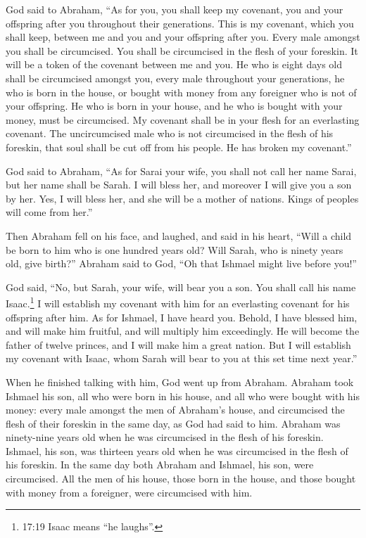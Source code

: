  God said to Abraham, ``As for you, you shall keep my
covenant, you and your offspring after you throughout their generations.
 This is my covenant, which you shall keep, between me and
you and your offspring after you. Every male amongst you shall be
circumcised.  You shall be circumcised in the flesh of your
foreskin. It will be a token of the covenant between me and you.
 He who is eight days old shall be circumcised amongst you,
every male throughout your generations, he who is born in the house, or
bought with money from any foreigner who is not of your offspring.
 He who is born in your house, and he who is bought with
your money, must be circumcised. My covenant shall be in your flesh for
an everlasting covenant.  The uncircumcised male who is not
circumcised in the flesh of his foreskin, that soul shall be cut off
from his people. He has broken my covenant.''

 God said to Abraham, ``As for Sarai your wife, you shall
not call her name Sarai, but her name shall be Sarah.  I
will bless her, and moreover I will give you a son by her. Yes, I will
bless her, and she will be a mother of nations. Kings of peoples will
come from her.''

 Then Abraham fell on his face, and laughed, and said in
his heart, ``Will a child be born to him who is one hundred years old?
Will Sarah, who is ninety years old, give birth?''  Abraham
said to God, ``Oh that Ishmael might live before you!''

 God said, ``No, but Sarah, your wife, will bear you a son.
You shall call his name Isaac.\footnote{17:19 Isaac means ``he laughs''.}
I will establish my covenant with him for an everlasting covenant for
his offspring after him.  As for Ishmael, I have heard you.
Behold, I have blessed him, and will make him fruitful, and will
multiply him exceedingly. He will become the father of twelve princes,
and I will make him a great nation.  But I will establish
my covenant with Isaac, whom Sarah will bear to you at this set time
next year.''

 When he finished talking with him, God went up from
Abraham.  Abraham took Ishmael his son, all who were born
in his house, and all who were bought with his money: every male amongst
the men of Abraham's house, and circumcised the flesh of their foreskin
in the same day, as God had said to him.  Abraham was
ninety-nine years old when he was circumcised in the flesh of his
foreskin.  Ishmael, his son, was thirteen years old when he
was circumcised in the flesh of his foreskin.  In the same
day both Abraham and Ishmael, his son, were circumcised. 
All the men of his house, those born in the house, and those bought with
money from a foreigner, were circumcised with him.

